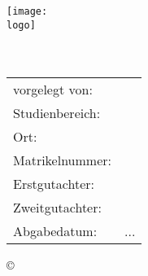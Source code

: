 \thispagestyle{plain}
\begin{titlepage}
	\begin{center}
		\vspace*{2.5cm}
		\texttt{[image: \\logo]}\\[1.25cm]
		\Large{\textbf{\art}}\\[1.5ex]
		\LARGE{\textbf{\titel}}\\[3.5ex]
		

		\normalsize
		\begin{tabular}{p{5.4cm}p{7cm}}\\
			vorgelegt von:  & \quad \autor\\[1.2ex]
			Studienbereich: & \quad \studienbereich\\[1.2ex]
			Ort: & \quad \ort\\[1.2ex]
			Matrikelnummer: & \quad \matrikelnr\\[1.2ex]
			Erstgutachter:  & \quad \erstgutachter\\[1.2ex]
			Zweitgutachter: & \quad \zweitgutachter\\[8ex]
			Abgabedatum:    & \quad ...
		\end{tabular}
		
		\copyright\ \jahr\\[9ex]
	\end{center}
	
	
\end{titlepage}